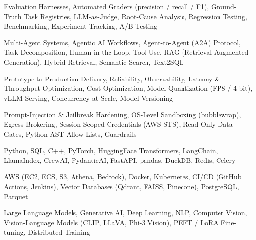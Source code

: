 \documentclass[letter,10pt]{article}
\begin{document}
 Evaluation Harnesses, Automated Graders (precision / recall / F1), Ground-Truth Task Registries, LLM-as-Judge, Root-Cause Analysis, Regression Testing, Benchmarking, Experiment Tracking, A/B Testing\par\vspace{2pt}

 Multi-Agent Systems, Agentic AI Workflows, Agent-to-Agent (A2A) Protocol, Task Decomposition, Human-in-the-Loop, Tool Use, RAG (Retrieval-Augmented Generation), Hybrid Retrieval, Semantic Search, Text2SQL\par\vspace{2pt}

 Prototype-to-Production Delivery, Reliability, Observability, Latency \& Throughput Optimization, Cost Optimization, Model Quantization (FP8 / 4-bit), vLLM Serving, Concurrency at Scale, Model Versioning\par\vspace{2pt}

 Prompt-Injection \& Jailbreak Hardening, OS-Level Sandboxing (bubblewrap), Egress Brokering, Session-Scoped Credentials (AWS STS), Read-Only Data Gates, Python AST Allow-Lists, Guardrails\par\vspace{2pt}

 Python, SQL, C++, PyTorch, HuggingFace Transformers, LangChain, LlamaIndex, CrewAI, PydanticAI, FastAPI, pandas, DuckDB, Redis, Celery\par\vspace{2pt}

 AWS (EC2, ECS, S3, Athena, Bedrock), Docker, Kubernetes, CI/CD (GitHub Actions, Jenkins), Vector Databases (Qdrant, FAISS, Pinecone), PostgreSQL, Parquet\par\vspace{2pt}

 Large Language Models, Generative AI, Deep Learning, NLP, Computer Vision, Vision-Language Models (CLIP, LLaVA, Phi-3 Vision), PEFT / LoRA Fine-tuning, Distributed Training
\end{document}
